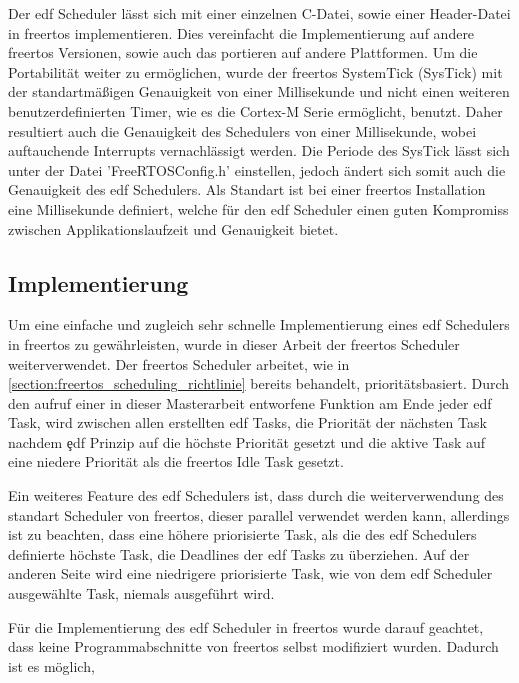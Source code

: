\documentclass[../EDF Master Thesis.tex]{subfiles}
\begin{document}
Der \ac{edf} Scheduler lässt sich mit einer einzelnen C-Datei, sowie einer Header-Datei in \ac{freertos} implementieren.
Dies vereinfacht die Implementierung auf andere \ac{freertos} Versionen, sowie auch das portieren auf andere Plattformen.
Um die Portabilität weiter zu ermöglichen, wurde der \ac{freertos} SystemTick (SysTick) mit der standartmäßigen Genauigkeit von einer Millisekunde und nicht einen weiteren benutzerdefinierten Timer, wie es die Cortex-M Serie ermöglicht, benutzt.
Daher resultiert auch die Genauigkeit des Schedulers von einer Millisekunde, wobei auftauchende Interrupts vernachlässigt werden.
Die Periode des SysTick lässt sich unter der Datei 'FreeRTOSConfig.h' einstellen, jedoch ändert sich somit auch die Genauigkeit des \ac{edf} Schedulers.
Als Standart ist bei einer \ac{freertos} Installation eine Millisekunde definiert, welche für den \ac{edf} Scheduler einen guten Kompromiss zwischen Applikationslaufzeit und Genauigkeit bietet.

\subsection{Implementierung} \label{section:implementierung}
    Um eine einfache und zugleich sehr schnelle Implementierung eines \ac{edf} Schedulers in \ac{freertos} zu gewährleisten, wurde in dieser Arbeit der \ac{freertos} Scheduler weiterverwendet.
    Der \ac{freertos} Scheduler arbeitet, wie in \autoref{section:freertos_scheduling_richtlinie} bereits behandelt, prioritätsbasiert.
    Durch den aufruf einer in dieser Masterarbeit entworfene Funktion am Ende jeder \ac{edf} Task, wird zwischen allen erstellten \ac{edf} Tasks, die Priorität der nächsten Task nachdem \c{edf} Prinzip auf die höchste Priorität gesetzt und die aktive Task auf eine niedere Priorität als die \ac{freertos} Idle Task gesetzt.
    


Ein weiteres Feature des \ac{edf} Schedulers ist, dass durch die weiterverwendung des standart Scheduler von \ac{freertos}, dieser parallel verwendet werden kann, allerdings ist zu beachten, dass eine höhere priorisierte Task, als die des \ac{edf} Schedulers definierte höchste Task, die Deadlines der \ac{edf} Tasks zu überziehen.
Auf der anderen Seite wird eine niedrigere priorisierte Task, wie von dem \ac{edf} Scheduler ausgewählte Task, niemals ausgeführt wird.

Für die Implementierung des \ac{edf} Scheduler in \ac{freertos} wurde darauf geachtet, dass keine Programmabschnitte von \ac{freertos} selbst modifiziert wurden.
Dadurch ist es möglich, 
\end{document}
